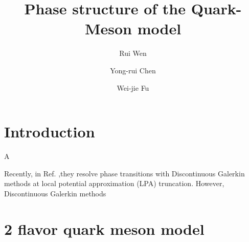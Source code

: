 \documentclass[%
reprint,
superscriptaddress,
showpacs,preprintnumbers,
 amsmath,amssymb,
 aps,
prd,
]{revtex4-1}
\begin{document}
\preprint{}

\title{Phase structure of the Quark-Meson model}

\author{Rui Wen}

\author{Yong-rui Chen}

\author{Wei-jie Fu}


\begin{abstract}

 


\end{abstract}

\maketitle


\section{Introduction}
\label{sec:intro}

A

Recently, in Ref. \cite{Grossi:2019urj},they resolve phase transitions with Discontinuous Galerkin methods at local  potential  approximation (LPA) truncation. However, Discontinuous Galerkin methods
\section{2 flavor quark meson model}
\label{sec:QM}
\end{document}
